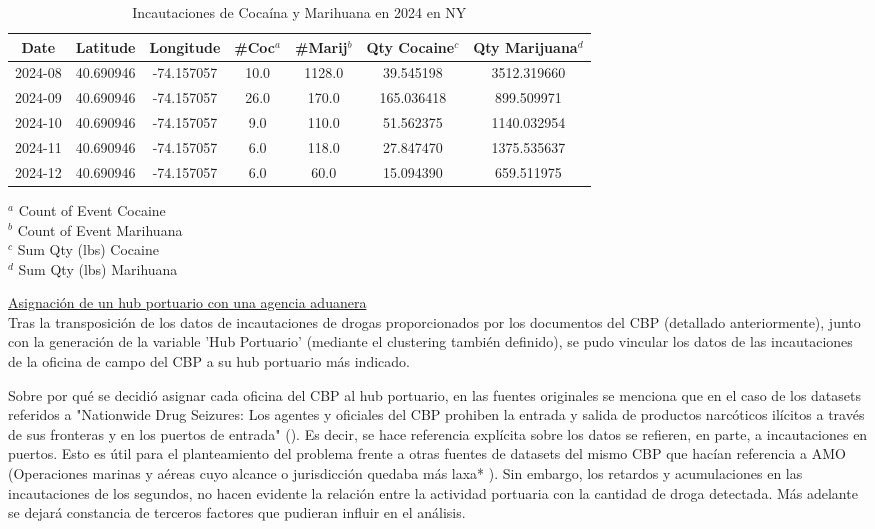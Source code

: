 \documentclass[12pt]{article}
\begin{document}
		\begingroup
		\small
		\begin{table}[H]
			\caption{Incautaciones de Cocaína y Marihuana en 2024 en NY}
			\label{tabla_incautaciones_2024}
			\begin{center}
			\begin{tabular}{|c|c|c|c|c|c|c|}
				\hline
				\textbf{Date} & \textbf{Latitude} & \textbf{Longitude} & \textbf{\#Coc$^a$} & \textbf{\#Marij$^b$} & \textbf{Qty Cocaine$^c$} & \textbf{Qty Marijuana$^d$} \\
				\hline
				2024-08 & 40.690946 & -74.157057 & 10.0 & 1128.0 & 39.545198 & 3512.319660 \\
				\hline
				2024-09 & 40.690946 & -74.157057 & 26.0 & 170.0 & 165.036418 & 899.509971 \\
				\hline
				2024-10 & 40.690946 & -74.157057 & 9.0 & 110.0 & 51.562375 & 1140.032954 \\
				\hline
				2024-11 & 40.690946 & -74.157057 & 6.0 & 118.0 & 27.847470 & 1375.535637 \\
				\hline
				2024-12 & 40.690946 & -74.157057 & 6.0 & 60.0 & 15.094390 & 659.511975 \\
				\hline
			\end{tabular}
			\end{center}
			$^a$ Count of Event Cocaine \\
			$^b$ Count of Event Marihuana \\
			$^c$ Sum Qty (lbs) Cocaine \\ 
			$^d$ Sum Qty (lbs) Marihuana
		\end{table}
		\endgroup
		

		\underline{Asignación de un hub portuario con una agencia aduanera}\\
		Tras la transposición de los datos de incautaciones de drogas proporcionados por los documentos del CBP (detallado anteriormente), junto con la generación de la variable 'Hub Portuario' (mediante el clustering también definido), se pudo vincular los datos de las incautaciones de la oficina de campo del CBP a su hub portuario más indicado.
		
		Sobre por qué se decidió asignar cada oficina del CBP al hub portuario, en las fuentes originales se menciona que en el caso de los datasets referidos a "Nationwide Drug Seizures: Los agentes y oficiales del CBP prohiben la entrada y salida de productos narcóticos ilícitos a través de sus fronteras y en los puertos de entrada" (\cite {cbp2025drugseizures}). Es decir, se hace referencia explícita sobre los datos se refieren, en parte, a incautaciones en puertos. Esto es útil para el planteamiento del problema frente a otras fuentes de datasets del mismo CBP que hacían referencia a AMO (Operaciones marinas y aéreas cuyo alcance o jurisdicción quedaba más laxa* \cite{cbp2025amodrugseizures}). Sin embargo, los retardos y acumulaciones en las incautaciones de los segundos, no hacen evidente la relación entre la actividad portuaria con la cantidad de droga detectada. Más adelante se dejará constancia de terceros factores que pudieran influir en el análisis.
		
\end{document}
